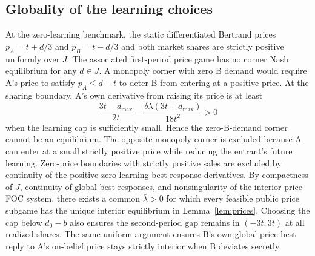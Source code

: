 \documentclass[11pt,a4paper]{article}
\numberwithin{equation}{section}
\theoremstyle{remark}
\begin{document}
\subsection*{Globality of the learning choices}

At the zero-learning benchmark, the static differentiated Bertrand prices
$p_A=t+d/3$ and $p_B=t-d/3$ and both market shares are strictly positive
uniformly over $J$. The associated first-period price game has no corner
Nash equilibrium for any $d\in J$. A monopoly corner with zero B demand would require A's price to
satisfy $p_A\le d-t$ to deter B from entering at a positive price. At
the sharing boundary, A's own derivative from raising its price is
at least
\[
\frac{3t-d_{\max}}{2t}
-\frac{\delta\bar\lambda(3t+d_{\max})}{18t^2}>0
\]
when the learning cap is sufficiently small. Hence the zero-B-demand
corner cannot be an equilibrium. The opposite monopoly corner is
excluded because A can enter at a small strictly positive price while
reducing the entrant's future learning. Zero-price boundaries with
strictly positive sales are excluded by continuity of the positive
zero-learning best-response derivatives. By compactness of $J$, continuity of global
best responses, and nonsingularity of the interior price-FOC system,
there exists a common $\bar\lambda>0$ for which every feasible
public price subgame has the unique interior equilibrium in
Lemma~\ref{lem:prices}. Choosing the cap below $d_0-\bar b$ also ensures
the second-period gap remains in $(-3t,3t)$ at all realized shares.
The same uniform argument ensures B's own global price best reply to
A's on-belief price stays strictly interior when B deviates secretly.
\end{document}
